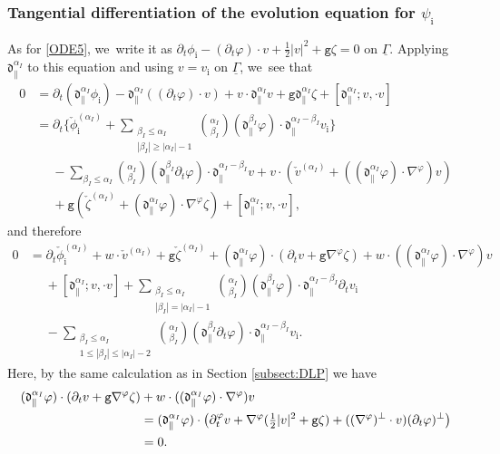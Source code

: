 \documentclass[11pt]{article}
\newcommand{\dpar}{{\mathfrak d}_{\parallel}}
\newcommand{\gr}{{\mathtt g}}
\newcommand{\dt}{\partial_t}
\newcommand{\ul}[1]{\underline{#1}}
\newcommand{\itGamma}{\mathit{\Gamma}}
\theoremstyle{definition}
\begin{document}
\subsubsection{Tangential differentiation of the evolution equation for $\psi_\mathrm{i}$}
As for \eqref{ODE5}, we~write it as $\dt\phi_\mathrm{i}-(\dt\varphi)\cdot v+\frac12|v|^2+\gr\zeta=0$ on $\ul{\itGamma}$.
Applying $\dpar^{\alpha_I}$ to this equation and using $v=v_\mathrm{i}$ on $\ul{\itGamma}$, we~see that
\begin{align*}
0 &= \dt(\dpar^{\alpha_I}\phi_\mathrm{i}) - \dpar^{\alpha_I}((\dt\varphi)\cdot v) + v\cdot\dpar^{\alpha_I}v + \gr\dpar^{\alpha_I}\zeta + [\dpar^{\alpha_I};v,\cdot v] \\
&= \dt\biggl\{ \check{\phi}_\mathrm{i}^{(\alpha_I)}
+ \sum_{\substack{\beta_I\leq\alpha_I\\ |\beta_I|\geq|\alpha_I|-1}} \binom{\alpha_I}{\beta_I}(\dpar^{\beta_I}\varphi)\cdot\dpar^{\alpha_I-\beta_I}v_\mathrm{i} \biggr\} \\
&\quad\; - \sum_{\beta_I\leq\alpha_I} \binom{\alpha_I}{\beta_I}(\dpar^{\beta_I}\dt\varphi)\cdot\dpar^{\alpha_I-\beta_I}v
+ v\cdot(\check{v}^{(\alpha_I)}+((\dpar^{\alpha_I}\varphi)\cdot\nabla^\varphi)v) \\
&\quad\; + \gr(\check{\zeta}^{(\alpha_I)}+(\dpar^{\alpha_I}\varphi)\cdot\nabla^\varphi\zeta)+ [\dpar^{\alpha_I};v,\cdot v],
\end{align*}
and therefore
\begin{align*}
0&= \dt\check{\phi}_\mathrm{i}^{(\alpha_I)} + w\cdot\check{v}^{(\alpha_I)} + \gr\check{\zeta}^{(\alpha_I)}
+ (\dpar^{\alpha_I}\varphi)\cdot(\dt v +\gr\nabla^\varphi\zeta) + w\cdot((\dpar^{\alpha_I}\varphi)\cdot\nabla^\varphi)v \\
&\quad\; + [\dpar^{\alpha_I};v,\cdot v]
+ \sum_{\substack{\beta_I\leq\alpha_I\\ |\beta_I|=|\alpha_I|-1}} \binom{\alpha_I}{\beta_I}(\dpar^{\beta_I}\varphi)\cdot\dpar^{\alpha_I-\beta_I}\dt v_\mathrm{i} \\
&\quad\; - \sum_{\substack{\beta_I\leq\alpha_I\\ 1\leq|\beta_I|\leq|\alpha_I|-2}} \binom{\alpha_I}{\beta_I}(\dpar^{\beta_I}\dt\varphi)\cdot\dpar^{\alpha_I-\beta_I}v_\mathrm{i}.
\end{align*}
Here, by the same calculation as in Section \ref{subsect:DLP} we have
\begin{align*}
(\dpar^{\alpha_I}\varphi)\cdot(\dt v +\gr\nabla^\varphi\zeta) &+ w\cdot((\dpar^{\alpha_I}\varphi)\cdot\nabla^\varphi)v \\
&= (\dpar^{\alpha_I}\varphi)\cdot\bigl(\dt^\varphi v + \nabla^\varphi(\tfrac12|v|^2+\mbox{\tt g}\zeta) + ((\nabla^\varphi)^\perp\cdot v)(\dt\varphi)^\perp \bigr) \\
&= 0.
\end{align*}
\end{document}
